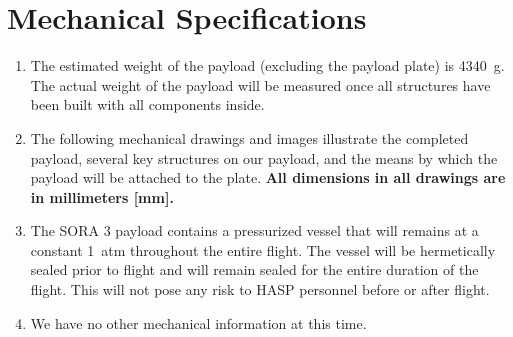 \newpage
\section{Mechanical Specifications}
\label{sec:Mechanical}

\hspace*{0.5cm}
\begin{minipage}{\linewidth-0.5cm}
  \begin{enumerate}[label=\Alph*.]
  \item The estimated weight of the payload (excluding the payload plate) is \SI{4340}{\gram}. The actual weight of the payload will be measured once all structures have been built with all components inside.
  \item The following mechanical drawings and images illustrate the completed payload, several key structures on our payload, and the means by which the payload will be attached to the plate. \textbf{All dimensions in all drawings are in millimeters [\si{\milli\meter}].}
  \item The SORA 3 payload contains a pressurized vessel that will remains at a constant \SI{1}{atm} throughout the entire flight. The vessel will be hermetically sealed prior to flight and will remain sealed for the entire duration of the flight. This will not pose any risk to HASP personnel before or after flight.
  \item We have no other mechanical information at this time.
  \end{enumerate}
\end{minipage}

\hspace{1cm}

